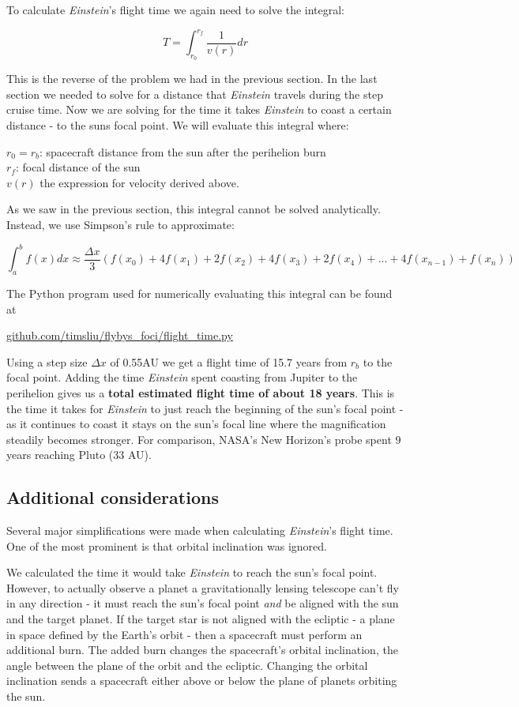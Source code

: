 \documentclass[12pt]{article} %
\begin{document}
To calculate \textit{Einstein}'s flight time we again need to solve the integral:

$$T = \int_{r_0}^{r_f} \frac{1}{v(r)} dr$$

This is the reverse of the problem we had in the previous section. In the last section we needed to solve for a distance that \textit{Einstein} travels during the step cruise time. Now we are solving for the time it takes \textit{Einstein} to coast a certain distance - to the suns focal point. We will evaluate this integral where:

$r_0 = r_b$: spacecraft distance from the sun after the perihelion burn\\
$r_f$: focal distance of the sun\\
$v(r)$ the expression for velocity derived above.

As we saw in the previous section, this integral cannot be solved analytically. Instead, we use Simpson's rule to approximate:

$$\int_a^b f(x) dx \approx \frac{\Delta x}{3} (f(x_0) + 4f(x_1)+ 2f(x_2) + 4f(x_3) + 2 f(x_4) + ... + 4f(x_{n-1}) + f(x_n))$$

The Python program used for numerically evaluating this integral can be found at 

\url{github.com/timsliu/flybys_foci/flight_time.py}

Using a step size $\Delta x$ of 0.55AU we get a flight time of 15.7 years from $r_b$ to the focal point. Adding the time \textit{Einstein} spent coasting from Jupiter to the perihelion gives us a \textbf{total estimated flight time of about \textbf{18 years}}. This is the time it takes for \textit{Einstein} to just reach the beginning of the sun's focal point - as it continues to coast it stays on the sun's focal line where the magnification steadily becomes stronger. For comparison, NASA's New Horizon's probe spent 9 years reaching Pluto (33 AU).

\subsection{Additional considerations}
Several major simplifications were made when calculating \textit{Einstein}'s flight time. One of the most prominent is that orbital inclination was ignored.


We calculated the time it would take \textit{Einstein} to reach the sun's focal point. However, to actually observe a planet a gravitationally lensing telescope can't fly in any direction - it must reach the sun's focal point \textit{and} be aligned with the sun and the target planet. If the target star is not aligned with the ecliptic - a plane in space defined by the Earth's orbit - then a spacecraft must perform an additional burn. The added burn changes the spacecraft's orbital inclination, the angle between the plane of the orbit and the ecliptic. Changing the orbital inclination sends a spacecraft either above or below the plane of planets orbiting the sun.
\end{document}
